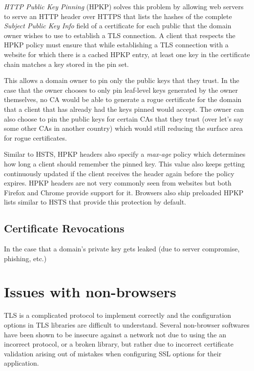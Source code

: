 \emph{HTTP Public Key Pinning} (HPKP) solves this problem by allowing web
servers to serve an HTTP header over HTTPS that lists the hashes of the
complete \emph{Subject Public Key Info} field of a certificate for each public
that the domain owner wishes to use to establish a TLS connection. A client
that respects the HPKP policy must ensure that while establishing a TLS
connection with a website for which there is a cached HPKP entry, at least one
key in the certificate chain matches a key stored in the pin set.

This allows a domain owner to pin only the public keys that they trust. In the
case that the owner chooses to only pin leaf-level keys generated by the owner
themselves, no CA would be able to generate a rogue certificate for the domain
that a client that has already had the keys pinned would accept. The owner can
also choose to pin the public keys for certain CAs that they trust (over let's
say some other CAs in another country) which would still reducing the surface
area for rogue certificates.

Similar to HSTS, HPKP headers also specify a \emph{max-age} policy which
determines how long a client should remember the pinned key. This value also
keeps getting continuously updated if the client receives the header again
before the policy expires. HPKP headers are not very commonly seen from
websites but both Firefox and Chrome provide support for it. Browsers also
ship preloaded HPKP lists similar to HSTS that provide this protection
by default.

\subsection{Certificate Revocations}
In the case that a domain's private key gets leaked (due to server compromise,
phishing, etc.)


\section{Issues with non-browsers}
\label{sec:problems-saber}

TLS is a complicated protocol to implement correctly and the configuration
options in TLS libraries are difficult to understand. Several non-browser
softwares have been shown to be insecure against a network not due to using the
an incorrect protocol, or a broken library, but rather due to incorrect
certificate validation arising out of mistakes when configuring SSL options for
their application.

